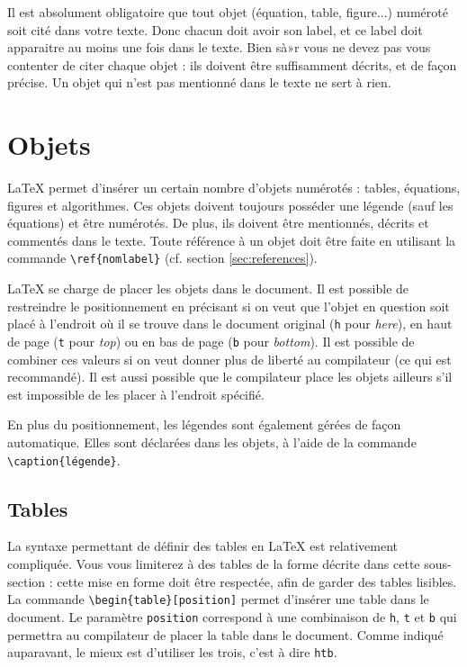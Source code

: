 \documentclass{ASD}
\begin{document}
Il est absolument obligatoire que tout objet (équation, table, figure...) numéroté soit cité dans votre texte. Donc chacun doit avoir son label, et ce label doit apparaitre au moins une fois dans le texte. Bien sà»r vous ne devez pas vous contenter de citer chaque objet : ils doivent être suffisamment décrits, et de façon précise. Un objet qui n'est pas mentionné dans le texte ne sert à rien.



\section{Objets}
\label{sec:objets}
\LaTeX{} permet d'insérer un certain nombre d'objets numérotés : tables, équations, figures et algorithmes. Ces objets doivent toujours posséder une légende (sauf les équations) et être numérotés. De plus, ils doivent être mentionnés, décrits et commentés dans le texte. Toute référence à un objet doit être faite en utilisant la commande \texttt{\textbackslash{}ref\{nomlabel\}} (cf\@. section \ref{sec:references}).
	 
\LaTeX{} se charge de placer les objets dans le document. Il est possible de restreindre le positionnement en précisant si on veut que l'objet en question soit placé à l'endroit où il se trouve dans le document original (\texttt{h} pour \textit{here}), en haut de page (\texttt{t} pour \textit{top}) ou en bas de page (\texttt{b} pour \textit{bottom}). Il est possible de combiner ces valeurs si on veut donner plus de liberté au compilateur (ce qui est recommandé). Il est aussi possible que le compilateur place les objets ailleurs s'il est impossible de les placer à l'endroit spécifié.
	
En plus du positionnement, les légendes sont également gérées de façon automatique. Elles sont déclarées dans les objets, à l'aide de la commande \texttt{\textbackslash{}caption\{légende\}}.
	
\subsection{Tables}
\label{sec:tables}
La syntaxe permettant de définir des tables en \LaTeX{} est relativement compliquée. Vous vous limiterez à des tables de la forme décrite dans cette sous-section : cette mise en forme doit être respectée, afin de garder des tables lisibles. La commande \texttt{\textbackslash{}begin\{table\}[position]} permet d'insérer une table dans le document. Le paramètre \texttt{position} correspond à une combinaison de \texttt{h}, \texttt{t} et \texttt{b} qui permettra au compilateur de placer la table dans le document. Comme indiqué auparavant, le mieux est d'utiliser les trois, c'est à dire \texttt{htb}.
	
\end{document}
